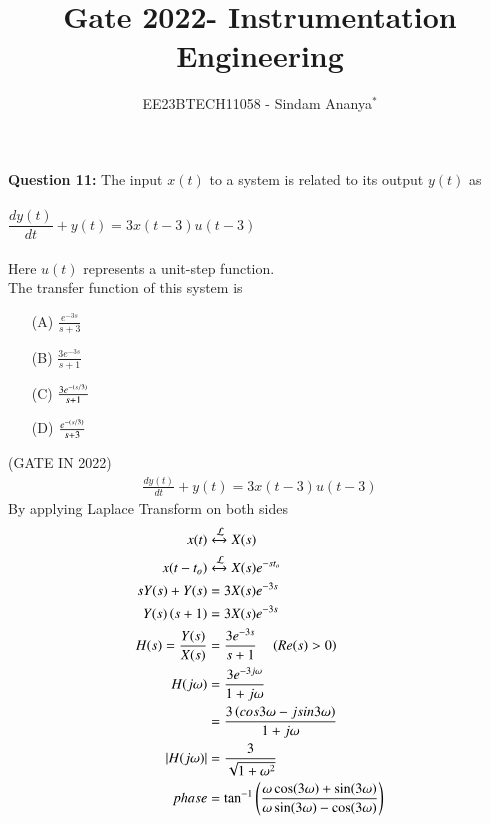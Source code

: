\documentclass[journal,12pt,twocolumn]{IEEEtran}
\theoremstyle{remark}
\begin{document}

\vspace{3cm}

\title{Gate 2022- Instrumentation Engineering}
\author{EE23BTECH11058 - Sindam Ananya$^{*}$%
}
\maketitle
\newpage
\bigskip

\renewcommand{\thefigure}{\theenumi}
\renewcommand{\thetable}{\theenumi}

\vspace{3cm}
\textbf{Question 11:} 
The input $x(t)$ to a system is related to its output $y(t)$ as \\ \\
$\dfrac{dy(t)}{dt} + y(t) = 3x(t-3)u(t-3)$\\ \\
Here $u(t)$ represents a unit-step function.\\
The transfer function of this system is 
\begin{enumerate}
\item[(A)] $\frac{e^{-3s}}{s+3}$\\
\item[(B)] $\frac{3e^{-3s}}{s+1}$\\
\item[(C)] $\frac{3e^{-\left(s/3\right)}}{s+1}$\\
\item[(D)] $\frac{e^{-\left(s/3\right)}}{s+3}$
\end{enumerate}
\hfill{(GATE IN 2022)}\\
\solution
\begin{align}
\frac{dy(t)}{dt} + y(t) = 3x(t-3)u(t-3)
\end{align}
By applying Laplace Transform on both sides\\
\begin{align}
x(t) &\xleftrightarrow{\mathcal{L}} X(s)\\
x(t-t_o) &\xleftrightarrow{\mathcal{L}} X(s)e^{-st_o}\\
sY(s) + Y(s) &= 3X(s)e^{-3s}\\
Y(s)\left(s+1\right) &= 3X(s)e^{-3s}\\
H(s) = \frac{Y(s)}{X(s)} &= \frac{3e^{-3s}}{s+1} \quad \left(Re(s)>0\right)\\
H(j\omega) &= \frac{3e^{-3j\omega}}{1+j\omega}\\
&= \frac{3\left(cos3\omega - jsin3\omega\right)}{1+j\omega}\\
\lvert{H(j\omega)} \rvert&= \frac{3}{\sqrt{1+\omega^{2}}}\\
phase &= \tan^{-1}\left(\frac{\omega \cos(3\omega) + \sin(3\omega)}{\omega \sin(3\omega) - \cos(3\omega)}\right)
\end{align}
\end{document}
